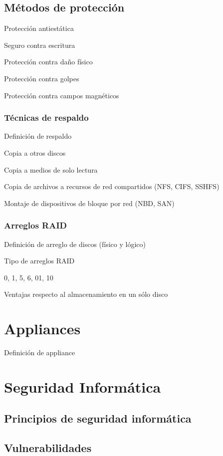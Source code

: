       \subsection {M\'{e}todos de protecci\'{o}n}

Protecci\'{o}n antiest\'{a}tica

Seguro contra escritura

Protecci\'{o}n contra da\~{n}o f\'{i}sico

Protecci\'{o}n contra golpes

Protecci\'{o}n contra campos magn\'{e}ticos

        \subsubsection {T\'{e}cnicas de respaldo}

Definici\'{o}n de respaldo

Copia a otros discos

Copia a medios de solo lectura

Copia de archivos a recursos de red compartidos (NFS, CIFS, SSHFS)

Montaje de dispositivos de bloque por red (NBD, SAN)

        \subsubsection {Arreglos RAID}

Definici\'{o}n de arreglo de discos (f\'{i}sico y l\'{o}gico)

Tipo de arreglos RAID

0, 1, 5, 6, 01, 10

Ventajas respecto al almacenamiento en un s\'{o}lo disco

    \section {Appliances}

Definici\'{o}n de appliance

    \section {Seguridad Inform\'{a}tica}
      \subsection {Principios de seguridad inform\'{a}tica}
      \subsection {Vulnerabilidades}
